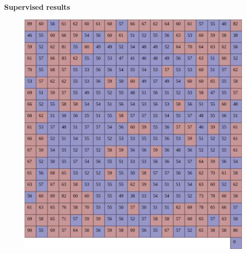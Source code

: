 \documentclass[xcolor=dvipsnames]{beamer}
\begin{document}
\begin{frame}{\bf Supervised results}

\begin{figure}[!htb]
  \centering
  \includegraphics[scale=0.22]{../../pictures/moves_success_rate_testing_top5.png}
\end{figure}


\end{frame}
\end{document}
